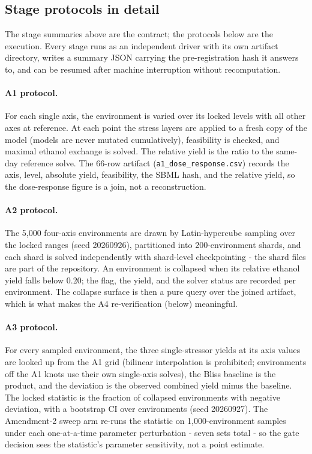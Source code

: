 \documentclass[12pt]{article}
\begin{document}
\subsection{Stage protocols in detail}
\label{sec:stageprotocols}

The stage summaries above are the contract; the protocols below are
the execution. Every stage runs as an independent driver with its own
artifact directory, writes a summary JSON carrying the
pre-registration hash it answers to, and can be resumed after machine
interruption without recomputation.

\paragraph{A1 protocol.} For each single axis, the environment is
varied over its locked levels with all other axes at reference. At
each point the stress layers are applied to a fresh copy of the model
(models are never mutated cumulatively), feasibility is checked, and
maximal ethanol exchange is solved. The relative yield is the ratio
to the same-day reference solve. The 66-row artifact
(\texttt{a1\_dose\_response.csv}) records the axis, level, absolute
yield, feasibility, the SBML hash, and the relative yield, so the
dose-response figure is a join, not a reconstruction.

\paragraph{A2 protocol.} The 5{,}000 four-axis environments are drawn
by Latin-hypercube sampling over the locked ranges (seed 20260926),
partitioned into 200-environment shards, and each shard is solved
independently with shard-level checkpointing - the shard files are
part of the repository. An environment is collapsed when its relative
ethanol yield falls below 0.20; the flag, the yield, and the solver
status are recorded per environment. The collapse surface is then a
pure query over the joined artifact, which is what makes the A4
re-verification (below) meaningful.

\paragraph{A3 protocol.} For every sampled environment, the three
single-stressor yields at its axis values are looked up from the A1
grid (bilinear interpolation is prohibited; environments off the A1
knots use their own single-axis solves), the Bliss baseline is the
product, and the deviation is the observed combined yield minus the
baseline. The locked statistic is the fraction of collapsed
environments with negative deviation, with a bootstrap CI over
environments (seed 20260927). The Amendment-2 sweep arm re-runs the
statistic on 1{,}000-environment samples under each one-at-a-time
parameter perturbation - seven sets total - so the gate decision
sees the statistic's parameter sensitivity, not a point estimate.
\end{document}
